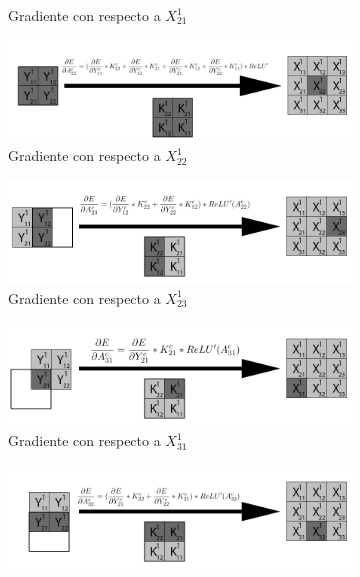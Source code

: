 \begin{figure}[H]
\begin{subfigure}{.5\textwidth}
		\caption{Gradiente con respecto a $X^1_{21}$}
	\end{subfigure}
		\vspace{5mm}
	\begin{subfigure}{.5\textwidth}
		\hspace{-25mm}
		\includegraphics[width=1.4\linewidth]{imagenes/conv_back_entrada_5.jpg}  
		\caption{Gradiente con respecto a $X^1_{22}$}
	\end{subfigure}%
	\begin{subfigure}{.5\textwidth}
		\hspace{5mm}
		\includegraphics[width=1.4\linewidth]{imagenes/conv_back_entrada_6.jpg}  
		\caption{Gradiente con respecto a $X^1_{23}$}
	\end{subfigure}
		\vspace{5mm}
	\begin{subfigure}{.5\textwidth}
		\hspace{-25mm}
		\includegraphics[width=1.4\linewidth]{imagenes/conv_back_entrada_7.jpg}  
		\caption{Gradiente con respecto a $X^1_{31}$}
	\end{subfigure}%
	\begin{subfigure}{.5\textwidth}
		\hspace{5mm}
		\includegraphics[width=1.4\linewidth]{imagenes/conv_back_entrada_8.jpg}  

\end{subfigure}
\end{figure}
